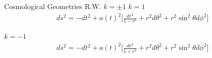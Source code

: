 \documentclass{beamer}
\begin{document}


\begin{frame}{Cosmological Geometries R.W. $k=\pm 1$}
	$k=1$
	\begin{eqnarray*}
		ds^2 = -dt^2 + a(t)^2\bigg[\frac{dr^2}{1-r^2} + r^2 d\theta^2 + r^2 \sin^2\theta d\phi^2\bigg]
	\end{eqnarray*}

	$k=-1$
	\begin{eqnarray*}
		ds^2 = -dt^2 + a(t)^2\bigg[\frac{dr^2}{1+r^2} + r^2 d\theta^2 + r^2 \sin^2\theta d\phi^2\bigg]
	\end{eqnarray*}
\end{frame}

\end{document}
